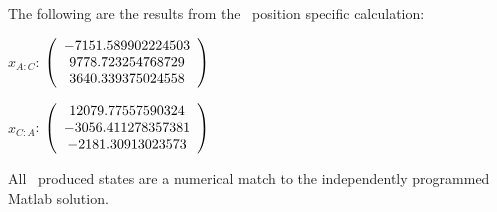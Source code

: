 \begin{description}
The following are the results from the \ position specific calculation:

$x_{A:C}$: $\left( \begin{array} {ccc}  -7151.589902224503 \\     9778.723254768729 \\     3640.339375024558
\end{array} \right)\\ \\$

$x_{C:A}$: $\left( \begin{array} {ccc} 12079.77557590324 \\    -3056.411278357381 \\     -2181.30913023573
\end{array} \right)\\ \\$

All \ produced states are a numerical match to the independently programmed Matlab solution.

\end{description}

